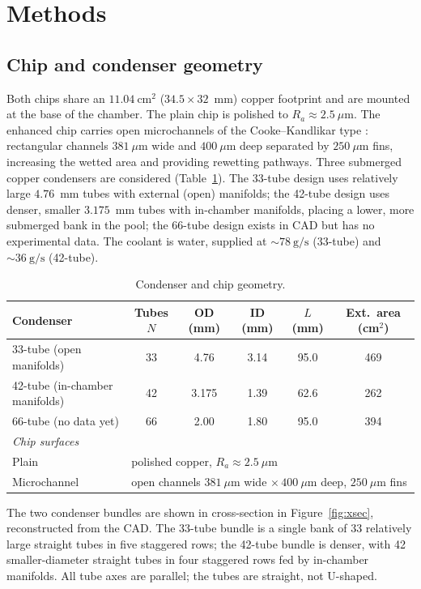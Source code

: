 \documentclass[11pt]{article}
\begin{document}
\section{Methods}

\subsection{Chip and condenser geometry}
Both chips share an $11.04~\mathrm{cm^2}$ ($34.5\times32$~mm) copper footprint and are
mounted at the base of the chamber. The plain chip is polished to $R_a\approx2.5~\mu$m.
The enhanced chip carries open microchannels of the Cooke--Kandlikar type
\cite{cooke2012}: rectangular channels $381~\mu$m wide and $400~\mu$m deep separated by
$250~\mu$m fins, increasing the wetted area and providing rewetting pathways. Three
submerged copper condensers are considered (Table~\ref{tab:geom}). The 33-tube design uses
relatively large $4.76$~mm tubes with external (open) manifolds; the 42-tube design uses
denser, smaller $3.175$~mm tubes with in-chamber manifolds, placing a lower, more
submerged bank in the pool; the 66-tube design exists in CAD but has no experimental data.
The coolant is water, supplied at $\sim\!78~\mathrm{g/s}$ (33-tube) and
$\sim\!36~\mathrm{g/s}$ (42-tube).

\begin{table}[H]
\centering
\caption{Condenser and chip geometry.}
\label{tab:geom}
\begin{tabular}{lccccc}
\toprule
Condenser & Tubes $N$ & OD (mm) & ID (mm) & $L$ (mm) & Ext.\ area (cm$^2$)\\
\midrule
33-tube (open manifolds)       & 33 & 4.76  & 3.14 & 95.0 & 469 \\
42-tube (in-chamber manifolds) & 42 & 3.175 & 1.39 & 62.6 & 262 \\
66-tube (no data yet)          & 66 & 2.00  & 1.80 & 95.0 & 394 \\
\midrule
\multicolumn{6}{l}{\textit{Chip surfaces}}\\
Plain        & \multicolumn{5}{l}{polished copper, $R_a\approx2.5~\mu$m}\\
Microchannel & \multicolumn{5}{l}{open channels $381~\mu$m wide $\times\,400~\mu$m deep, $250~\mu$m fins}\\
\bottomrule
\end{tabular}
\end{table}

The two condenser bundles are shown in cross-section in Figure~\ref{fig:xsec}, reconstructed
from the CAD. The 33-tube bundle is a single bank of 33 relatively large straight tubes in five
staggered rows; the 42-tube bundle is denser, with 42 smaller-diameter straight tubes in four
staggered rows fed by in-chamber manifolds. All tube axes are parallel; the tubes are straight,
not U-shaped.
\end{document}
